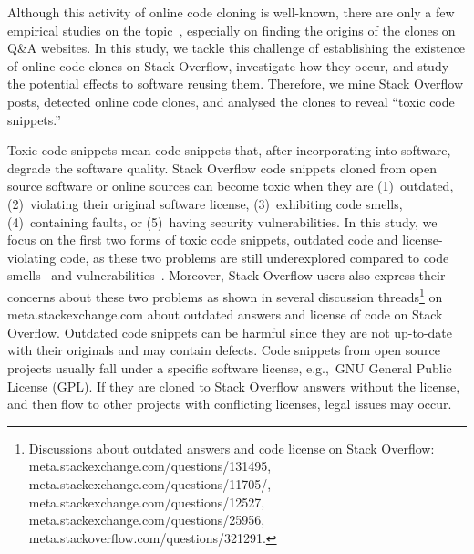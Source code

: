 \documentclass[10pt,journal,compsoc]{IEEEtran}
\begin{document}
Although this activity of online code cloning is well-known, there are only a few
empirical studies on the topic~\cite{An2017,Abdalkareem2017,Baltes2017}, especially
on finding the origins of the clones on Q\&A websites.
In this study, we tackle this challenge of establishing the existence of online code 
clones on Stack Overflow, investigate how they occur, and study the potential
effects to software reusing them.
Therefore, we mine Stack Overflow posts, detected online code clones, and analysed the clones to reveal
``toxic code snippets.''

Toxic code snippets mean code snippets that, after incorporating into software, degrade the software quality.
Stack Overflow code snippets
cloned from open source software or online sources can become toxic when they
are (1)~outdated, (2)~violating their original software
license, (3)~exhibiting code smells, (4)~containing faults, or (5)~having security vulnerabilities.
In this study, we focus on the first two forms of toxic code snippets, outdated code and license-violating code,
as these two problems are still underexplored compared to code smells~\cite{Tufano2015} and vulnerabilities~\cite{Acar2016,Fischer2017}.
Moreover, Stack Overflow users also express their concerns about these two problems
as shown in several discussion threads\footnote{Discussions about outdated answers and code license on
	Stack Overflow: meta.stackexchange.com/questions/131495, 
	meta.stackexchange.com/questions/11705/, meta.stackexchange.com/questions/12527,
	meta.stackexchange.com/questions/25956, meta.stackoverflow.com/questions/321291.}
	 on \textsf{meta.stackexchange.com} about outdated
answers and license of code on Stack Overflow.
Outdated code snippets can be harmful since they are not up-to-date with their originals and may
contain defects. Code snippets from open source projects usually fall under a
specific software license, e.g.,\ GNU General Public License (GPL). If they are
cloned to Stack Overflow answers without the license, and then flow to other projects
with conflicting licenses, legal issues may occur.
\end{document}
